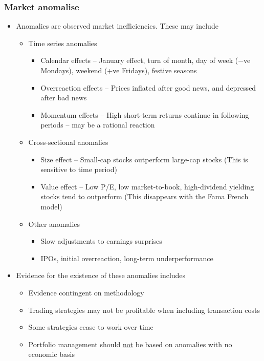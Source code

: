 \documentclass[../notes_compiled.tex]{subfiles}
\begin{document}
\subsubsection{Market anomalise}
\begin{itemize}
\item Anomalies are observed market inefficiencies. These may include
\begin{itemize}
\item Time series anomalies
\begin{itemize}
\item Calendar effects -- January effect, turn of month, day of week ($-$ve Mondays), weekend (+ve Fridays), festive seasons
\item Overreaction effects -- Prices inflated after good news, and depressed after bad news
\item Momentum effects -- High short-term returns continue in following periods -- may be a rational reaction
\end{itemize}

\item Cross-sectional anomalies
\begin{itemize}
\item Size effect -- Small-cap stocks outperform large-cap stocks (This is sensitive to time period)
\item Value effect -- Low P/E, low market-to-book, high-dividend yielding stocks tend to outperform (This disappears with the Fama French model)
\end{itemize}

\item Other anomalies
\begin{itemize}
\item Slow adjustments to earnings surprises
\item IPOs, initial overreaction, long-term underperformance
\end{itemize}
\end{itemize}


\item Evidence for the existence of these anomalies includes
\begin{itemize}
\item Evidence contingent on methodology
\item Trading strategies may not be profitable when including transaction costs
\item Some strategies cease to work over time
\item Portfolio management should \underline{not} be based on anomalies with no economic basis
\end{itemize}

\end{itemize}
\end{document}
